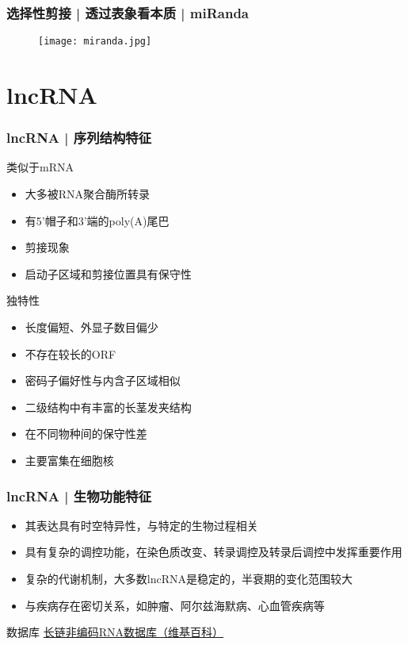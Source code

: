 \begin{frame}
  \frametitle{选择性剪接 | 透过表象看本质 | miRanda}
  \begin{figure}
    \centering
    \texttt{[image: miranda.jpg]}
  \end{figure}
\end{frame}

\section{lncRNA}
\begin{frame}
  \frametitle{lncRNA | 序列结构特征}
  \begin{block}{类似于mRNA}
    \begin{itemize}
      \item 大多被RNA聚合酶所转录
      \item 有5'帽子和3'端的poly(A)尾巴
      \item 剪接现象
      \item 启动子区域和剪接位置具有保守性
    \end{itemize}
  \end{block}
  \pause
  \begin{block}{独特性}
  \begin{itemize}
    \item 长度偏短、外显子数目偏少
    \item 不存在较长的ORF
    \item 密码子偏好性与内含子区域相似
    \item 二级结构中有丰富的长茎发夹结构
    \item 在不同物种间的保守性差
    \item 主要富集在细胞核
  \end{itemize}
  \end{block}
\end{frame}

\begin{frame}
  \frametitle{lncRNA | 生物功能特征}
  \begin{itemize}
    \item 其表达具有时空特异性，与特定的生物过程相关
    \item 具有复杂的调控功能，在染色质改变、转录调控及转录后调控中发挥重要作用
    \item 复杂的代谢机制，大多数lncRNA是稳定的，半衰期的变化范围较大
    \item 与疾病存在密切关系，如肿瘤、阿尔兹海默病、心血管疾病等
  \end{itemize}
  \pause
  \begin{block}{数据库}
    \href{http://zh.wikipedia.org/wiki/\%E9\%95\%BF\%E9\%93\%BE\%E9\%9D\%9E\%E7\%BC\%96\%E7\%A0\%81RNA\%E6\%95\%B0\%E6\%8D\%AE\%E5\%BA\%93}{长链非编码RNA数据库（维基百科）}
  \end{block}
\end{frame}

